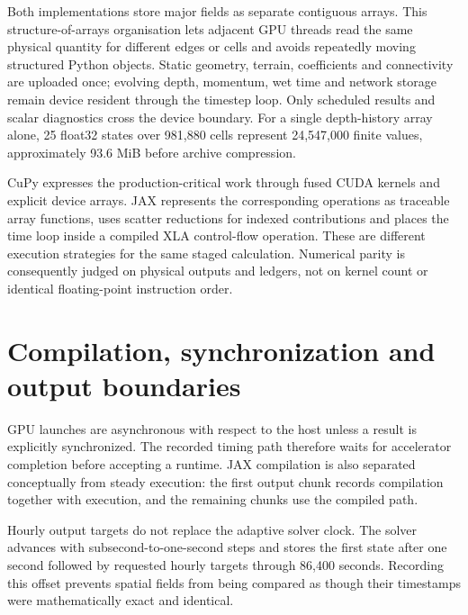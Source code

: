 \documentclass[11pt,a4paper,oneside]{report}
\begin{document}
Both implementations store major fields as separate contiguous arrays. This
structure-of-arrays organisation lets adjacent GPU threads read the same physical quantity
for different edges or cells and avoids repeatedly moving structured Python objects. Static
geometry, terrain, coefficients and connectivity are uploaded once; evolving depth,
momentum, wet time and network storage remain device resident through the timestep loop.
Only scheduled results and scalar diagnostics cross the device boundary. For a single
depth-history array alone, 25 float32 states over 981,880 cells represent 24,547,000 finite
values, approximately 93.6 MiB before archive compression.

CuPy expresses the production-critical work through fused CUDA kernels and explicit device
arrays. JAX represents the corresponding operations as traceable array functions, uses
scatter reductions for indexed contributions and places the time loop inside a compiled XLA
control-flow operation. These are different execution strategies for the same staged
calculation. Numerical parity is consequently judged on physical outputs and ledgers, not
on kernel count or identical floating-point instruction order.

\section{Compilation, synchronization and output boundaries}
GPU launches are asynchronous with respect to the host unless a result is explicitly
synchronized. The recorded timing path therefore waits for accelerator completion before
accepting a runtime. JAX compilation is also separated conceptually from steady execution:
the first output chunk records compilation together with execution, and the remaining
chunks use the compiled path.

Hourly output targets do not replace the adaptive solver clock. The solver advances with
subsecond-to-one-second steps and stores the first state after one second followed by requested
hourly targets through 86,400 seconds. Recording this offset prevents spatial fields from being
compared as though their timestamps were mathematically exact and identical.
\end{document}
